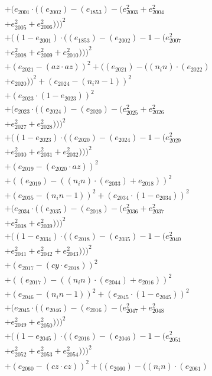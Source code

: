 \documentclass[10pt, a4paper]{article}
\begin{document}
\begin{small}
\begin{align*}
& + (e_{2001}  \cdot  ((e_{2002}) - (e_{1853}) - (e_{2003}^{2} + e_{2004}^{2} \\
& + e_{2005}^{2} + e_{2006}^{2})))^{2} \\
& + ((1 - e_{2001})  \cdot  ((e_{1853}) - (e_{2002}) - 1 - (e_{2007}^{2} \\
& + e_{2008}^{2} + e_{2009}^{2} + e_{2010}^{2})))^{2} \\
& + (e_{2021} - (az  \cdot  az))^{2} + ((e_{2021}) - ((n_in)  \cdot  (e_{2022}) \\
& + e_{2020}))^{2} + (e_{2024} - (n_in - 1))^{2} \\
& + (e_{2023}  \cdot  (1 - e_{2023}))^{2} \\
& + (e_{2023}  \cdot  ((e_{2024}) - (e_{2020}) - (e_{2025}^{2} + e_{2026}^{2} \\
& + e_{2027}^{2} + e_{2028}^{2})))^{2} \\
& + ((1 - e_{2023})  \cdot  ((e_{2020}) - (e_{2024}) - 1 - (e_{2029}^{2} \\
& + e_{2030}^{2} + e_{2031}^{2} + e_{2032}^{2})))^{2} \\
& + (e_{2019} - (e_{2020}  \cdot  az))^{2} \\
& + ((e_{2019}) - ((n_in)  \cdot  (e_{2033}) + e_{2018}))^{2} \\
& + (e_{2035} - (n_in - 1))^{2} + (e_{2034}  \cdot  (1 - e_{2034}))^{2} \\
& + (e_{2034}  \cdot  ((e_{2035}) - (e_{2018}) - (e_{2036}^{2} + e_{2037}^{2} \\
& + e_{2038}^{2} + e_{2039}^{2})))^{2} \\
& + ((1 - e_{2034})  \cdot  ((e_{2018}) - (e_{2035}) - 1 - (e_{2040}^{2} \\
& + e_{2041}^{2} + e_{2042}^{2} + e_{2043}^{2})))^{2} \\
& + (e_{2017} - (cy  \cdot  e_{2018}))^{2} \\
& + ((e_{2017}) - ((n_in)  \cdot  (e_{2044}) + e_{2016}))^{2} \\
& + (e_{2046} - (n_in - 1))^{2} + (e_{2045}  \cdot  (1 - e_{2045}))^{2} \\
& + (e_{2045}  \cdot  ((e_{2046}) - (e_{2016}) - (e_{2047}^{2} + e_{2048}^{2} \\
& + e_{2049}^{2} + e_{2050}^{2})))^{2} \\
& + ((1 - e_{2045})  \cdot  ((e_{2016}) - (e_{2046}) - 1 - (e_{2051}^{2} \\
& + e_{2052}^{2} + e_{2053}^{2} + e_{2054}^{2})))^{2} \\
& + (e_{2060} - (cz  \cdot  cz))^{2} + ((e_{2060}) - ((n_in)  \cdot  (e_{2061}) \\

\end{align*}
\end{small}
\end{document}
